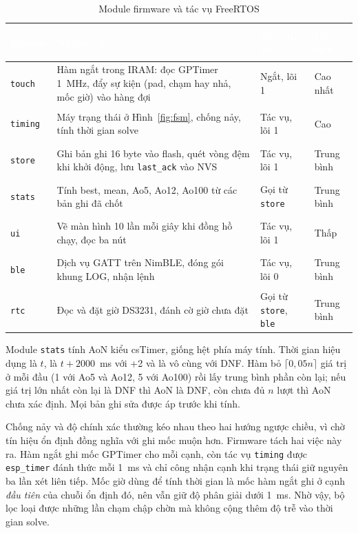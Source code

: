 \begin{table}[H]
    \centering
    \small
    \renewcommand{\arraystretch}{1.35}
    \caption{Module firmware và tác vụ FreeRTOS}
    \label{tab:tasks}
    \begin{tabular}{>{\bfseries\raggedright\arraybackslash}m{2.4cm} >{\raggedright\arraybackslash}m{6.4cm} >{\raggedright\arraybackslash}m{2.5cm} >{\raggedright\arraybackslash}m{2.6cm}}
        \toprule
        \rowcolor{haitayblue}
        \textcolor{white}{Module} & \textcolor{white}{Nhiệm vụ} & \textcolor{white}{Tác vụ, lõi} & \textcolor{white}{Ưu tiên} \\
        \midrule
        \rowcolor{haitayblue!8}
        \texttt{touch} & Hàm ngắt trong IRAM: đọc GPTimer 1~MHz, đẩy sự kiện (pad, chạm hay nhả, mốc giờ) vào hàng đợi & Ngắt, lõi 1 & Cao nhất \\
        \texttt{timing} & Máy trạng thái ở Hình~\ref{fig:fsm}, chống nảy, tính thời gian solve & Tác vụ, lõi 1 & Cao \\
        \rowcolor{haitayblue!8}
        \texttt{store} & Ghi bản ghi 16 byte vào flash, quét vòng đệm khi khởi động, lưu \texttt{last\_ack} vào NVS & Tác vụ, lõi 1 & Trung bình \\
        \texttt{stats} & Tính best, mean, Ao5, Ao12, Ao100 từ các bản ghi đã chốt & Gọi từ \texttt{store} & Trung bình \\
        \rowcolor{haitayblue!8}
        \texttt{ui} & Vẽ màn hình 10 lần mỗi giây khi đồng hồ chạy, đọc ba nút & Tác vụ, lõi 1 & Thấp \\
        \texttt{ble} & Dịch vụ GATT trên NimBLE, đóng gói khung LOG, nhận lệnh & Tác vụ, lõi 0 & Trung bình \\
        \rowcolor{haitayblue!8}
        \texttt{rtc} & Đọc và đặt giờ DS3231, đánh cờ giờ chưa đặt & Gọi từ \texttt{store}, \texttt{ble} & Trung bình \\
        \bottomrule
    \end{tabular}
\end{table}

Module \texttt{stats} tính AoN kiểu csTimer, giống hệt phía máy tính. Thời gian hiệu dụng là $t$, là $t + 2000$~ms với +2 và là vô cùng với DNF. Hàm bỏ $\lceil 0{,}05n \rceil$ giá trị ở mỗi đầu (1 với Ao5 và Ao12, 5 với Ao100) rồi lấy trung bình phần còn lại; nếu giá trị lớn nhất còn lại là DNF thì AoN là DNF, còn chưa đủ $n$ lượt thì AoN chưa xác định. Mọi bản ghi sửa được áp trước khi tính.

Chống nảy và độ chính xác thường kéo nhau theo hai hướng ngược chiều, vì chờ tín hiệu ổn định đồng nghĩa với ghi mốc muộn hơn. Firmware tách hai việc này ra. Hàm ngắt ghi mốc GPTimer cho mỗi cạnh, còn tác vụ \texttt{timing} được \texttt{esp\_timer} đánh thức mỗi 1~ms và chỉ công nhận cạnh khi trạng thái giữ nguyên ba lần xét liên tiếp. Mốc giờ dùng để tính thời gian là mốc hàm ngắt ghi ở cạnh \emph{đầu tiên} của chuỗi ổn định đó, nên vẫn giữ độ phân giải dưới 1~ms. Nhờ vậy, bộ lọc loại được những lần chạm chập chờn mà không cộng thêm độ trễ vào thời gian solve.

